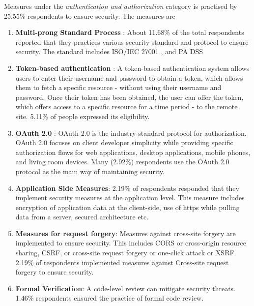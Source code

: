 Measures under the \emph{authentication and authorization} category is practised by 25.55\% respondents to ensure security. The measures are 
\begin{enumerate}[label=(\alph*)]

    \item \textbf{Multi-prong Standard Process} : About 11.68\% of the total respondents reported that they practices various security standard and protocol to ensure security. The standard includes ISO/IEC 27001 , and PA DSS
    
    \item \textbf{Token-based authentication} : A token-based authentication system allows users to enter their username and password to obtain a token, which allows them to fetch a specific resource - without using their username and password. Once their token has been obtained, the user can offer the token, which offers access to a specific resource for a time period - to the remote site. 5.11\% of people expressed its eligibility.
    
    \item \textbf{OAuth 2.0} : OAuth 2.0 is the industry-standard protocol for authorization. OAuth 2.0 focuses on client developer simplicity while providing specific authorization flows for web applications, desktop applications, mobile phones, and living room devices. Many (2.92\%) respondents use the OAuth 2.0 protocol as the main way of maintaining security.
    
    \item \textbf{Application Side Measures}: 2.19\% of respondents responded that they implement security measures at the application level. This measure includes encryption of application data at the client-side, use of https while pulling data from a server, secured architecture etc.
    
    \item \textbf{Measures for request forgery}: Measures against cross-site forgery are implemented to ensure security. This includes CORS or cross-origin resource sharing, CSRF, or cross-site request forgery or one-click attack or XSRF. 2.19\% of respondents implemented measures against  Cross-site request forgery to ensure security.
    
    \item \textbf{Formal Verification}: A code-level review can mitigate security threats. 1.46\% respondents ensured the practice of formal code review.
    
\end{enumerate}

